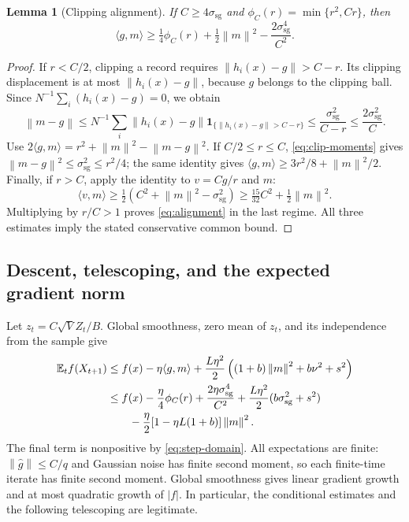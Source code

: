 \documentclass[11pt]{article}
\newtheorem{lemma}[theorem]{Lemma}
\newcommand{\E}{\mathbb E}
\newcommand{\norm}[1]{\left\lVert #1\right\rVert}
\newcommand{\sg}{\mathrm{sg}}
\begin{document}
\begin{lemma}[Clipping alignment]\label{lem:alignment}
If $C\ge4\sigma_{\sg}$ and $\phi_C(r)=\min\{r^2,Cr\}$, then
\begin{equation}\label{eq:alignment}
 \langle g,m\rangle\ge\tfrac14\phi_C(r)+\tfrac12\norm m^2
                          -\frac{2\sigma_{\sg}^4}{C^2}.
\end{equation}
\end{lemma}
\begin{proof}
If $r<C/2$, clipping a record requires
$\norm{h_i(x)-g}>C-r$. Its clipping displacement is at most
$\norm{h_i(x)-g}$, because $g$ belongs to the clipping ball. Since
$N^{-1}\sum_i(h_i(x)-g)=0$, we obtain
\[
 \norm{m-g}\le N^{-1}\sum_i\norm{h_i(x)-g}
  \mathbf1_{\{\norm{h_i(x)-g}>C-r\}}
 \le\frac{\sigma_{\sg}^2}{C-r}\le\frac{2\sigma_{\sg}^2}{C}.
\]
Use $2\langle g,m\rangle=r^2+\norm m^2-\norm{m-g}^2$.
If $C/2\le r\le C$, \eqref{eq:clip-moments} gives
$\norm{m-g}^2\le\sigma_{\sg}^2\le r^2/4$; the same identity gives
$\langle g,m\rangle\ge3r^2/8+\norm m^2/2$.
Finally, if $r>C$, apply the identity to $v=Cg/r$ and $m$:
\[
 \langle v,m\rangle\ge\tfrac12(C^2+\norm m^2-\sigma_{\sg}^2)
 \ge\tfrac{15}{32}C^2+\tfrac12\norm m^2.
\]
Multiplying by $r/C>1$ proves \eqref{eq:alignment} in the last regime.
All three estimates imply the stated conservative common bound.
\end{proof}

\subsection{Descent, telescoping, and the expected gradient norm}
Let $z_t=C\sqrt V Z_t/B$. Global smoothness, zero mean of $z_t$, and its
independence from the sample give
\begin{align}
 \E_t f(X_{t+1})
 &\le f(x)-\eta\langle g,m\rangle
   +\frac{L\eta^2}{2}\left((1+b)\norm m^2+b\nu^2+s^2\right)\notag\\
 &\le f(x)-\frac\eta4\phi_C(r)+\frac{2\eta\sigma_{\sg}^4}{C^2}
       +\frac{L\eta^2}{2}(b\sigma_{\sg}^2+s^2)\notag\\
 &\hspace{2em}-\frac\eta2[1-\eta L(1+b)]\norm m^2.\label{eq:descent}
\end{align}
The final term is nonpositive by \eqref{eq:step-domain}.
All expectations are finite: $\norm{\widehat g}\le C/q$ and Gaussian
noise has finite second moment, so each finite-time iterate has finite second
moment. Global smoothness gives linear gradient growth and at most quadratic
growth of $|f|$. In particular, the conditional estimates and the following
telescoping are legitimate.
\end{document}
